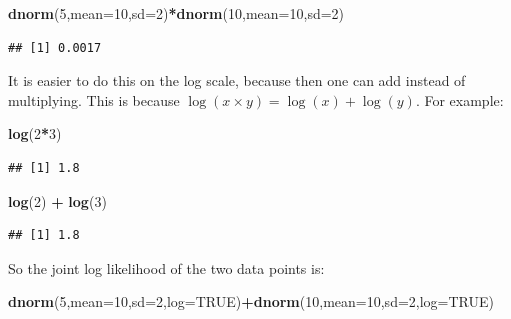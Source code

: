 \documentclass[12pt,]{krantz}
\newenvironment{Shaded}{\begin{snugshade}}{\end{snugshade}}
\newcommand{\DataTypeTok}[1]{\textcolor[rgb]{0.13,0.29,0.53}{#1}}
\newcommand{\DecValTok}[1]{\textcolor[rgb]{0.00,0.00,0.81}{#1}}
\newcommand{\KeywordTok}[1]{\textcolor[rgb]{0.13,0.29,0.53}{\textbf{#1}}}
\newcommand{\NormalTok}[1]{#1}
\newcommand{\OperatorTok}[1]{\textcolor[rgb]{0.81,0.36,0.00}{\textbf{#1}}}
\newcommand{\OtherTok}[1]{\textcolor[rgb]{0.56,0.35,0.01}{#1}}
\newcommand{\StringTok}[1]{\textcolor[rgb]{0.31,0.60,0.02}{#1}}
\theoremstyle{definition}
\theoremstyle{definition}
\theoremstyle{definition}
\theoremstyle{remark}
\begin{document}
\begin{Shaded}
\begin{Highlighting}[]
\KeywordTok{dnorm}\NormalTok{(}\DecValTok{5}\NormalTok{,}\DataTypeTok{mean=}\DecValTok{10}\NormalTok{,}\DataTypeTok{sd=}\DecValTok{2}\NormalTok{)}\OperatorTok{*}\KeywordTok{dnorm}\NormalTok{(}\DecValTok{10}\NormalTok{,}\DataTypeTok{mean=}\DecValTok{10}\NormalTok{,}\DataTypeTok{sd=}\DecValTok{2}\NormalTok{)}
\end{Highlighting}
\end{Shaded}

\begin{verbatim}
## [1] 0.0017
\end{verbatim}

It is easier to do this on the log scale, because then one can add instead of multiplying. This is because \(\log(x\times y)= \log(x) + \log(y)\). For example:

\begin{Shaded}
\begin{Highlighting}[]
\KeywordTok{log}\NormalTok{(}\DecValTok{2}\OperatorTok{*}\DecValTok{3}\NormalTok{)}
\end{Highlighting}
\end{Shaded}

\begin{verbatim}
## [1] 1.8
\end{verbatim}

\begin{Shaded}
\begin{Highlighting}[]
\KeywordTok{log}\NormalTok{(}\DecValTok{2}\NormalTok{) }\OperatorTok{+}\StringTok{ }\KeywordTok{log}\NormalTok{(}\DecValTok{3}\NormalTok{)}
\end{Highlighting}
\end{Shaded}

\begin{verbatim}
## [1] 1.8
\end{verbatim}

So the joint log likelihood of the two data points is:

\begin{Shaded}
\begin{Highlighting}[]
\KeywordTok{dnorm}\NormalTok{(}\DecValTok{5}\NormalTok{,}\DataTypeTok{mean=}\DecValTok{10}\NormalTok{,}\DataTypeTok{sd=}\DecValTok{2}\NormalTok{,}\DataTypeTok{log=}\OtherTok{TRUE}\NormalTok{)}\OperatorTok{+}\KeywordTok{dnorm}\NormalTok{(}\DecValTok{10}\NormalTok{,}\DataTypeTok{mean=}\DecValTok{10}\NormalTok{,}\DataTypeTok{sd=}\DecValTok{2}\NormalTok{,}\DataTypeTok{log=}\OtherTok{TRUE}\NormalTok{)}
\end{Highlighting}
\end{Shaded}
\end{document}
